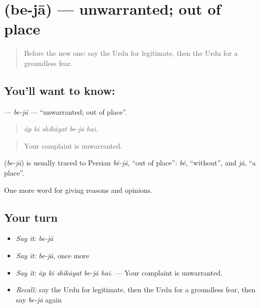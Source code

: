\section[\texorpdfstring{\ur{بے} \ur{جا} (be-jā)}{بے جا (be-jā)}]{  (be-jā) — unwarranted; out of place}

\label{lesson:UR-C354-be-ja}



\begin{quote}
Before the new one: say the Urdu for legitimate, then the Urdu for a groundless fear.
\end{quote}

\subsection*{You'll want to know:  }
\textbf{ } — \emph{be-jā} — \textquotedblleft{}unwarranted; out of place\textquotedblright{}.

\begin{quote}
     
\end{quote}

\begin{quote}
\emph{āp kī shikāyat be-jā hai.}
\end{quote}

\begin{quote}
Your complaint is unwarranted.
\end{quote}

\begin{cousinweb}
\textbf{ } (\emph{be-jā}) is usually traced to Persian \emph{bē-jā}, \textquotedblleft{}out of place\textquotedblright{}: \emph{bē}, \textquotedblleft{}without\textquotedblright{}, and \emph{jā}, \textquotedblleft{}a place\textquotedblright{}.
\end{cousinweb}

\begin{grammarlens}[title={What you've built}]
One more word for giving reasons and opinions.
\end{grammarlens}

\subsection*{Your turn}
\begin{itemize}
\raggedright
  \item \emph{Say it:} \emph{be-jā}
  \item \emph{Say it:} \emph{be-jā}, once more
  \item \emph{Say it:} \emph{āp kī shikāyat be-jā hai.} — Your complaint is unwarranted.
  \item \emph{Recall:} say the Urdu for legitimate, then the Urdu for a groundless fear, then say \emph{be-jā} again
\end{itemize}

